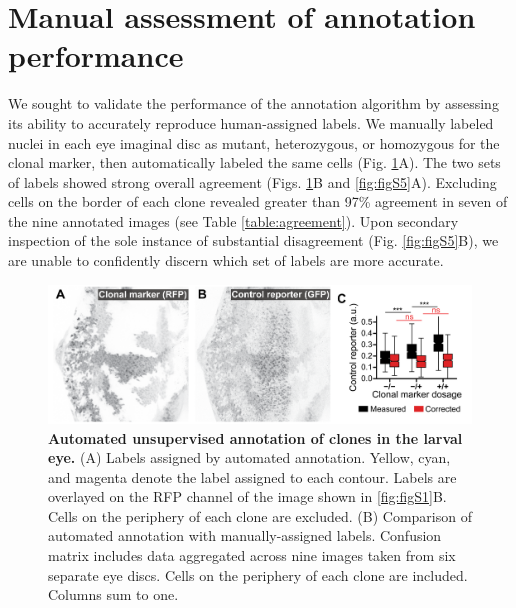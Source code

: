 \section{Manual assessment of annotation performance}

We sought to validate the performance of the annotation algorithm by assessing its ability to accurately reproduce human-assigned labels. We manually labeled nuclei in each eye imaginal disc as mutant, heterozygous, or homozygous for the clonal marker, then automatically labeled the same cells (Fig. \ref{fig:fig3}A). The two sets of labels showed strong overall agreement (Figs. \ref{fig:fig3}B and \ref{fig:figS5}A). Excluding cells on the border of each clone revealed greater than 97\% agreement in seven of the nine annotated images (see Table \ref{table:agreement}). Upon secondary inspection of the sole instance of substantial disagreement (Fig. \ref{fig:figS5}B), we are unable to confidently discern which set of labels are more accurate.

\begin{figure}[t]
\centering
\includegraphics[scale=1.0]{./figure_3}
\caption[Automated unsupervised annotation of clones in the larval eye.]{\textbf{Automated unsupervised annotation of clones in the larval eye.} (A) Labels assigned by automated annotation. Yellow, cyan, and magenta denote the label assigned to each contour. Labels are overlayed on the RFP channel of the image shown in \ref{fig:figS1}B. Cells on the periphery of each clone are excluded. (B) Comparison of automated annotation with manually-assigned labels. Confusion matrix includes data aggregated across nine images taken from six separate eye discs. Cells on the periphery of each clone are included. Columns sum to one.}
\label{fig:fig3}
\end{figure}

